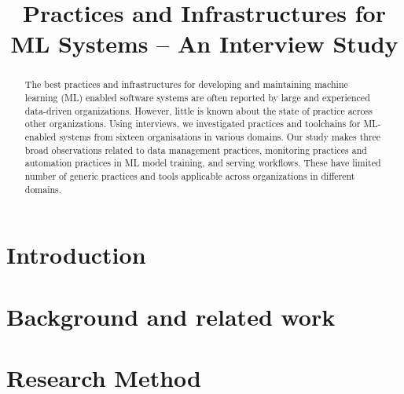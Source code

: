 \documentclass{IEEEcsmag}
\begin{document}
\title{Practices and Infrastructures for ML Systems -- An Interview Study}


\author{
}

\begin{abstract}
The best practices and infrastructures for developing and maintaining machine learning (ML) enabled software systems are often reported by large and experienced data-driven organizations. However, little is known about the state of practice across other organizations. Using interviews, we investigated practices and toolchains for ML-enabled systems from sixteen organisations in various domains. Our study makes three broad observations related to data management practices, monitoring practices and automation practices in ML model training, and serving workflows. These have limited number of generic practices and tools applicable across organizations in different domains.

\end{abstract}

\maketitle

\section{\textbf{Introduction}}
\label{sec: introduction}



\section{\textbf{Background and related work}}
\label{sec:background}



\section{\textbf{Research Method}}
\label{sec: methodology}



%
\end{document}
